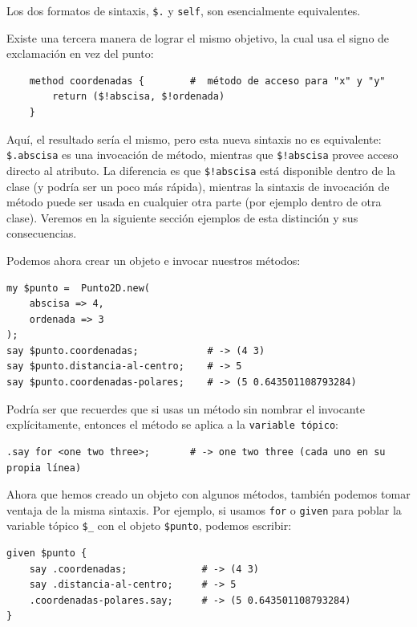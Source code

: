 Los dos formatos de sintaxis, \verb|$.| y {\tt self}, son
esencialmente equivalentes.

Existe una tercera manera de lograr el mismo objetivo,
la cual usa el signo de exclamación en vez del punto:

\begin{lstlisting}
    method coordenadas {        #  método de acceso para "x" y "y"
		return ($!abscisa, $!ordenada)
	}
\end{lstlisting}

Aquí, el resultado sería el mismo, pero esta nueva sintaxis
no es equivalente: \verb|$.abscisa| es una invocación de método,
mientras que \verb|$!abscisa| provee acceso directo al atributo. 
La diferencia es que \verb|$!abscisa| está disponible dentro de 
la clase (y podría ser un poco más rápida), mientras
la sintaxis de invocación de método puede ser usada en cualquier
otra parte (por ejemplo dentro de otra clase). Veremos en la 
siguiente sección ejemplos de esta distinción y sus consecuencias.

Podemos ahora crear un objeto e invocar nuestros métodos:

\begin{lstlisting}
my $punto =  Punto2D.new(
    abscisa => 4, 
    ordenada => 3
);
say $punto.coordenadas;            # -> (4 3)
say $punto.distancia-al-centro;    # -> 5
say $punto.coordenadas-polares;    # -> (5 0.643501108793284)
\end{lstlisting}

Podría ser que recuerdes que si usas un método sin nombrar el
invocante explícitamente, entonces el método se aplica
a la \verb|variable tópico|:

\begin{lstlisting}
.say for <one two three>;       # -> one two three (cada uno en su propia línea)
\end{lstlisting}

Ahora que hemos creado un objeto con algunos métodos, también
podemos tomar ventaja de la misma sintaxis. Por ejemplo, si 
usamos {\tt for} o {\tt given} para poblar la variable tópico
\verb|$_| con el objeto \verb|$punto|, podemos escribir:

\begin{lstlisting}
given $punto {
    say .coordenadas;             # -> (4 3)                       
    say .distancia-al-centro;     # -> 5                 
    .coordenadas-polares.say;     # -> (5 0.643501108793284)
}    
\end{lstlisting}

